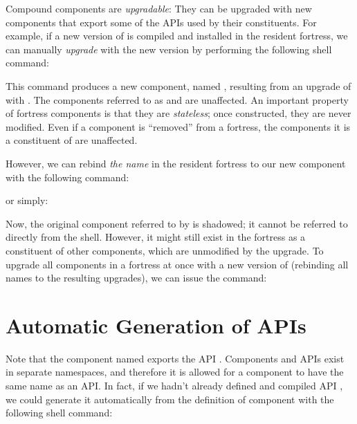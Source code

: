 Compound components are \emph{upgradable}: They can be upgraded with
new components that export some of the APIs used by their
constituents. For example, if a new version of  is compiled and
installed in the resident fortress,
we can manually \emph{upgrade}  with
the new version by performing the following shell command:


This command produces a new component, named ,
resulting from an upgrade of  with .
The components referred to as  and 
are unaffected. An important property of fortress components is that
they are \emph{stateless}; once constructed, they are never modified.
Even if a component is ``removed'' from a fortress, the components
it is a constituent of are unaffected.

However, we can rebind \emph{the name} 
in the resident fortress to our new component with the following command:


or simply:


Now, the original component referred to by  is
shadowed; it cannot be referred to directly from the shell.
However, it might still exist in the fortress as a constituent of
other components, which are unmodified by the upgrade.
To upgrade all components in a fortress at once
with a new version of  (rebinding all
names to the resulting upgrades), we can issue the command:


\section{Automatic Generation of APIs}

Note that the component named  exports the API
. Components and APIs exist in separate namespaces, and therefore
it is allowed for a component to have the same name as an API.
In fact, if we hadn't already defined and compiled API ,
we could generate it automatically
from the definition of component 
with the following shell command:

